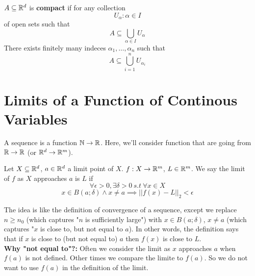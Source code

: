 \documentclass[openany]{report}
\begin{document}
\begin{definition}
    $A \subseteq \mathbb{R}^d$ is \textbf{compact} if for any collection
    \[U_\alpha: \alpha \in I\]
    of open sets such that 
    \[A \subseteq \bigcup_{\alpha \in I} U_\alpha\]
    There exists finitely many indeces $\alpha_1, \ldots, \alpha_n$ such that 
    \[A \subseteq \bigcup_{i=1}^n U_{\alpha_i}\]
\end{definition}
\chapter{Limits of a Function of Continous Variables}
A sequence is a function $\mathbb{N} \rightarrow \mathbb{R}$. Here, we'll consider function 
that are going from $\mathbb{R} \rightarrow \mathbb{R}$ (or $\mathbb{R}^d \rightarrow \mathbb{R}^m$).
\begin{definition}
    Let $X \subseteq \mathbb{R}^d$, $a \in \mathbb{R}^d$ a limit point of $X$.
    $f: X \rightarrow \mathbb{R}^m$, $L \in \mathbb{R}^m$. We say the limit of $f$
    as $X$ approaches $a$ is $L$ if 
    $$\forall \epsilon > 0, \exists \delta > 0 \ s.t \ \forall x \in X$$
    $$x\in B(a;\delta) \wedge x \neq a \implies ||f(x)-L||_2 < \epsilon$$
\end{definition}

The idea is like the definition of convergence of a sequence, except we replace $n \geq n_0$
(which captures "$n$ is sufficiently large") with $x \in B(a;\delta)$, $x \neq a$ (which captures
"$x$ is close to, but not equal to $a$). In other words, the definition says
that if $x$ is close to (but not equal to) $a$
 then $f(x)$ is close to $L$.\\[2ex]

 \textbf{Why "not equal to"?:} Often we consider the limit as $x$ approaches
 $a$ when $f(a)$ is not defined. Other times we compare the limite to $f(a)$.
 So we do not want to use $f(a)$ in the definition of the limit. \\[2ex]
\end{document}
